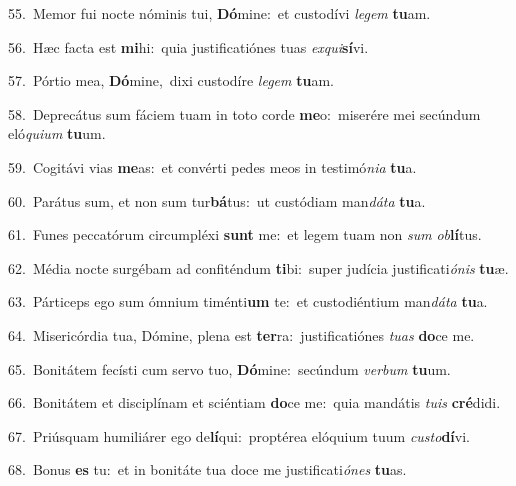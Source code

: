 {\numbfont\textcolor{\numbcolor}{55.}}~Memor fui nocte nóminis tui, \textbf{Dó}\-mine:~\star et custodívi \textit{le}\-\textit{gem} \textbf{tu}\-am.\par
{\numbfont\textcolor{\numbcolor}{56.}}~Hæc facta est \textbf{mi}\-hi:~\star quia justificatiónes tuas \textit{ex}\-\textit{qui}\textbf{sí}vi.\par
{\numbfont\textcolor{\numbcolor}{57.}}~Pórtio mea, \textbf{Dó}\-mine,~\star dixi custodíre \textit{le}\-\textit{gem} \textbf{tu}\-am.\par
{\numbfont\textcolor{\numbcolor}{58.}}~Deprecátus sum fáciem tuam in toto corde \textbf{me}\-o:~\star miserére mei secúndum eló\-\textit{qui}\-\textit{um} \textbf{tu}\-um.\par
{\numbfont\textcolor{\numbcolor}{59.}}~Cogitávi vias \textbf{me}\-as:~\star et convérti pedes meos in testimó\-\textit{ni}\-\textit{a} \textbf{tu}\-a.\par
{\numbfont\textcolor{\numbcolor}{60.}}~Parátus sum, et non sum tur\-\textbf{bá}\-tus:~\star ut custódiam man\-\textit{dá}\-\textit{ta} \textbf{tu}\-a.\par
{\numbfont\textcolor{\numbcolor}{61.}}~Funes peccatórum circumpléxi \textbf{sunt} me:~\star et legem tuam non \textit{sum} \textit{ob}\-\textbf{lí}tus.\par
{\numbfont\textcolor{\numbcolor}{62.}}~Média nocte surgébam ad confiténdum \textbf{ti}\-bi:~\star super judícia justificati\-\textit{ó}\-\textit{nis} \textbf{tu}\-æ.\par
{\numbfont\textcolor{\numbcolor}{63.}}~Párticeps ego sum ómnium timénti\textbf{um} te:~\star et custodiéntium man\-\textit{dá}\-\textit{ta} \textbf{tu}\-a.\par
{\numbfont\textcolor{\numbcolor}{64.}}~Misericórdia tua, Dómine, plena est \textbf{ter}\-ra:~\star justificatiónes \textit{tu}\-\textit{as} \textbf{do}\-ce me.\par
{\numbfont\textcolor{\numbcolor}{65.}}~Bonitátem fecísti cum servo tuo, \textbf{Dó}\-mine:~\star secúndum \textit{ver}\-\textit{bum} \textbf{tu}\-um.\par
{\numbfont\textcolor{\numbcolor}{66.}}~Bonitátem et disciplínam et sciéntiam \textbf{do}\-ce me:~\star quia mandátis \textit{tu}\-\textit{is} \textbf{cré}\-didi.\par
{\numbfont\textcolor{\numbcolor}{67.}}~Priúsquam humiliárer ego de\-\textbf{lí}\-qui:~\star proptérea elóquium tuum \textit{cus}\-\textit{to}\textbf{dí}vi.\par
{\numbfont\textcolor{\numbcolor}{68.}}~Bonus \textbf{es} tu:~\star et in bonitáte tua doce me justificati\-\textit{ó}\-\textit{nes} \textbf{tu}\-as.\par
